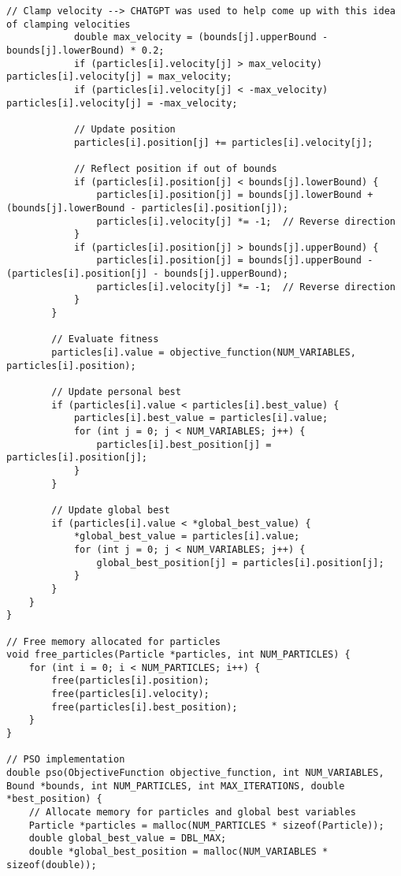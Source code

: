 \documentclass[12pt]{article}
\begin{document}
\begin{lstlisting}[basicstyle=\small]
            // Clamp velocity --> CHATGPT was used to help come up with this idea of clamping velocities
            double max_velocity = (bounds[j].upperBound - bounds[j].lowerBound) * 0.2;
            if (particles[i].velocity[j] > max_velocity) particles[i].velocity[j] = max_velocity;
            if (particles[i].velocity[j] < -max_velocity) particles[i].velocity[j] = -max_velocity;

            // Update position
            particles[i].position[j] += particles[i].velocity[j];

            // Reflect position if out of bounds
            if (particles[i].position[j] < bounds[j].lowerBound) {
                particles[i].position[j] = bounds[j].lowerBound + (bounds[j].lowerBound - particles[i].position[j]);
                particles[i].velocity[j] *= -1;  // Reverse direction
            }
            if (particles[i].position[j] > bounds[j].upperBound) {
                particles[i].position[j] = bounds[j].upperBound - (particles[i].position[j] - bounds[j].upperBound);
                particles[i].velocity[j] *= -1;  // Reverse direction
            }
        }

        // Evaluate fitness
        particles[i].value = objective_function(NUM_VARIABLES, particles[i].position);

        // Update personal best
        if (particles[i].value < particles[i].best_value) {
            particles[i].best_value = particles[i].value;
            for (int j = 0; j < NUM_VARIABLES; j++) {
                particles[i].best_position[j] = particles[i].position[j];
            }
        }

        // Update global best
        if (particles[i].value < *global_best_value) {
            *global_best_value = particles[i].value;
            for (int j = 0; j < NUM_VARIABLES; j++) {
                global_best_position[j] = particles[i].position[j];
            }
        }
    }
}

// Free memory allocated for particles
void free_particles(Particle *particles, int NUM_PARTICLES) {
    for (int i = 0; i < NUM_PARTICLES; i++) {
        free(particles[i].position);
        free(particles[i].velocity);
        free(particles[i].best_position);
    }
}

// PSO implementation
double pso(ObjectiveFunction objective_function, int NUM_VARIABLES, Bound *bounds, int NUM_PARTICLES, int MAX_ITERATIONS, double *best_position) {
    // Allocate memory for particles and global best variables
    Particle *particles = malloc(NUM_PARTICLES * sizeof(Particle));
    double global_best_value = DBL_MAX;
    double *global_best_position = malloc(NUM_VARIABLES * sizeof(double));


\end{lstlisting}
\end{document}
